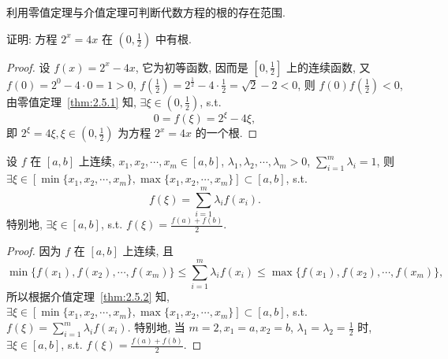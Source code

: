 \begin{figure}[htbp]
\centering
{}
\caption{}\label{fig:2.5.3}
\end{figure}

利用零值定理与介值定理可判断代数方程的根的存在范围.

\begin{example}\label{ex:2.5.2}
证明: 方程 $2^x = 4x$ 在 $\left(0, \frac{1}{2}\right)$ 中有根.
\end{example}

\begin{proof}
设 $f(x) = 2^x - 4x$, 它为初等函数, 因而是 $\left[0, \frac{1}{2}\right]$ 上的连续函数, 又 $f(0) = 2^0 - 4 \cdot 0 = 1 > 0$, $f\left(\frac{1}{2}\right) = 2^{\frac{1}{2}} - 4 \cdot \frac{1}{2} = \sqrt{2} - 2 < 0$, 则 $f(0)f\left(\frac{1}{2}\right) < 0$, 由零值定理~\ref{thm:2.5.1} 知, $\exists \xi \in \left(0, \frac{1}{2}\right)$, s.t.
\[
0 = f(\xi) = 2^{\xi} - 4\xi,
\]
即 $2^{\xi} = 4\xi, \xi \in \left(0, \frac{1}{2}\right)$ 为方程 $2^x = 4x$ 的一个根.
\end{proof}

\begin{example}\label{ex:2.5.3}
设 $f$ 在 $[a,b]$ 上连续, $x_1, x_2, \cdots, x_m \in [a,b]$, $\lambda_1, \lambda_2, \cdots, \lambda_m > 0$, $\sum\limits_{i=1}^{m} \lambda_i = 1$, 则 $\exists \xi \in [\min\{x_1, x_2, \cdots, x_m\}, \max\{x_1, x_2, \cdots, x_m\}] \subset [a,b]$, s.t.
\[
f(\xi) = \sum_{i=1}^{m} \lambda_i f(x_i).
\]
特别地, $\exists \xi \in [a,b]$, s.t. $f(\xi) = \frac{f(a) + f(b)}{2}$.
\end{example}

\begin{proof}
因为 $f$ 在 $[a,b]$ 上连续, 且
\[
\min\{f(x_1), f(x_2), \cdots, f(x_m)\} \leqslant \sum_{i=1}^{m} \lambda_i f(x_i) \leqslant \max\{f(x_1), f(x_2), \cdots, f(x_m)\},
\]
所以根据介值定理~\ref{thm:2.5.2} 知, $\exists \xi \in [\min\{x_1, x_2, \cdots, x_m\}, \max\{x_1, x_2, \cdots, x_m\}] \subset [a,b]$, s.t. $f(\xi) = \sum\limits_{i=1}^{m} \lambda_i f(x_i)$. 特别地, 当 $m = 2, x_1 = a, x_2 = b$, $\lambda_1 = \lambda_2 = \frac{1}{2}$ 时, $\exists \xi \in [a,b]$, s.t. $f(\xi) = \frac{f(a) + f(b)}{2}$.
\end{proof}


